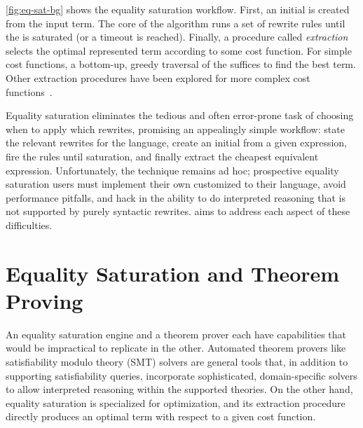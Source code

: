 \autoref{fig:eq-sat-bg} shows the equality saturation workflow.
First, an initial \egraph is created from the input term.
The core of the algorithm runs a set of rewrite rules until the \egraph is
  saturated (or a timeout is reached).
Finally, a procedure called \textit{extraction} selects the optimal represented
  term according to some cost function.
For simple cost functions, a bottom-up, greedy traversal of the \egraph suffices
  to find the best term.
Other extraction procedures have been explored for more complex cost
  functions~\cite{spores, wu_siga19}.

Equality saturation eliminates the tedious and often error-prone
  task of choosing when to apply which rewrites,
  promising an appealingly simple workflow: state the
  relevant rewrites for the language, create an initial \egraph from a given
  expression, fire the rules until saturation,
  and finally extract the cheapest equivalent expression.
Unfortunately, the technique remains ad hoc; prospective equality saturation
  users must implement their own \egraphs customized to their language, avoid
  performance pitfalls, and hack in the ability to do interpreted reasoning
  that is not supported by purely syntactic rewrites.
\egg aims to address each aspect of these difficulties.

\section{Equality Saturation and Theorem Proving}

An equality saturation engine and a theorem prover each have capabilities that
  would be impractical to replicate in the other.
Automated theorem provers like satisfiability modulo theory (SMT) solvers are
  general tools that, in addition to supporting satisfiability queries,
  incorporate sophisticated, domain-specific solvers to allow interpreted
  reasoning within the supported theories.
On the other hand, equality saturation is specialized for optimization, and its
  extraction procedure directly produces an optimal term with respect to a given
  cost function.


